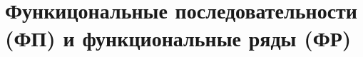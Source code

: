 \documentclass[../main.tex]{subfiles}
\begin{document}
 \chapter{Функицональные последовательности (ФП) и функциональные ряды (ФР)}
 
 
\end{document}
